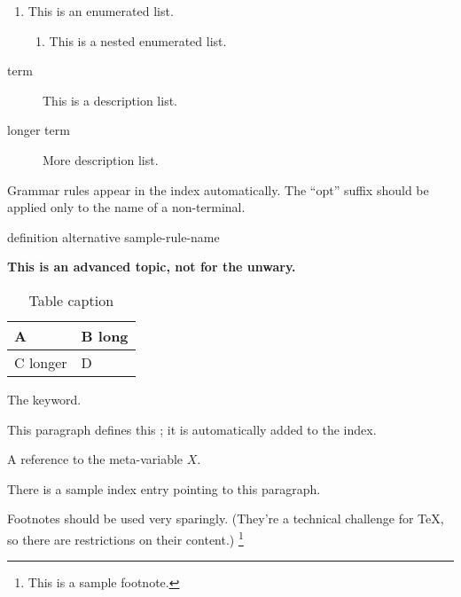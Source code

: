 \begin{enumerate}
\item
This is an enumerated list.
\begin{enumerate}
\item
This is a nested enumerated list.
\end{enumerate}
\end{enumerate}

\begin{description}
\item[term]
This is a description list.
\item[longer term]
More description list.
\end{description}

Grammar rules appear in the index automatically.
The ``opt'' suffix should be applied only to the name of a non-terminal.

\begin{bnf}
\br
definition
\br
alternative\opt
\br
\terminal{(}
sample-rule-name
\terminal{)}
\end{bnf}

{\bfseries
This is an advanced topic,
not for the unwary.
}

\begin{table}[hb]
\centering
\begin{tabular}{|l|l|}
\hline
A&B long%
\\ \hline
C longer&D%
\\ \hline
\end{tabular}
\caption{
Table caption
}
\end{table}

The
keyword.

This paragraph defines this
;
it is automatically added to the index.

A reference to the meta-variable $X$.

There is a sample index entry
pointing to this paragraph.

Footnotes should be used very sparingly.
(They're a technical challenge for TeX,
so there are restrictions on their content.)%
\footnote{
This is a sample footnote.
}

